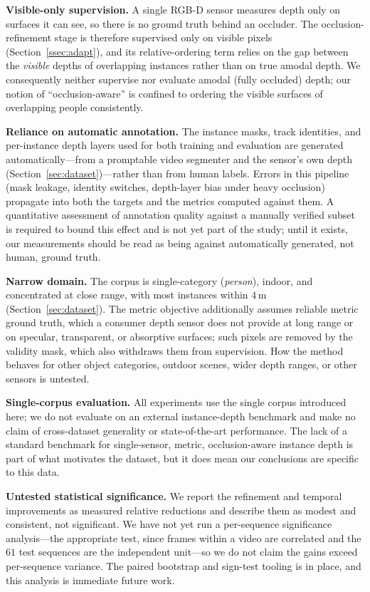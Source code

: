 \documentclass[sigconf, review=true]{acmart}
\begin{document}
\smallskip\noindent\textbf{Visible-only supervision.}
A single RGB-D sensor measures depth only on surfaces it can see, so there is no
ground truth behind an occluder. The occlusion-refinement stage is therefore
supervised only on visible pixels (Section~\ref{ssec:adapt}), and its
relative-ordering term relies on the gap between the \emph{visible} depths of
overlapping instances rather than on true amodal depth. We consequently neither
supervise nor evaluate amodal (fully occluded) depth; our notion of
``occlusion-aware'' is confined to ordering the visible surfaces of overlapping
people consistently.

\smallskip\noindent\textbf{Reliance on automatic annotation.}
The instance masks, track identities, and per-instance depth layers used for
both training and evaluation are generated automatically---from a promptable
video segmenter and the sensor's own depth (Section~\ref{sec:dataset})---rather
than from human labels. Errors in this pipeline (mask leakage, identity
switches, depth-layer bias under heavy occlusion) propagate into both the
targets and the metrics computed against them. A quantitative assessment of
annotation quality against a manually verified subset is required to bound this
effect and is not yet part of the study; until it exists, our measurements
should be read as being against automatically generated, not human, ground
truth.

\smallskip\noindent\textbf{Narrow domain.}
The corpus is single-category (\emph{person}), indoor, and concentrated at close
range, with most instances within $4\,$m (Section~\ref{sec:dataset}). The metric
objective additionally assumes reliable metric ground truth, which a consumer
depth sensor does not provide at long range or on specular, transparent, or
absorptive surfaces; such pixels are removed by the validity mask, which also
withdraws them from supervision. How the method behaves for other object
categories, outdoor scenes, wider depth ranges, or other sensors is untested.

\smallskip\noindent\textbf{Single-corpus evaluation.}
All experiments use the single corpus introduced here; we do not evaluate on an
external instance-depth benchmark and make no claim of cross-dataset generality
or state-of-the-art performance. The lack of a standard benchmark for
single-sensor, metric, occlusion-aware instance depth is part of what motivates
the dataset, but it does mean our conclusions are specific to this data.

\smallskip\noindent\textbf{Untested statistical significance.}
We report the refinement and temporal improvements as measured relative
reductions and describe them as modest and consistent, not significant. We have
not yet run a per-sequence significance analysis---the appropriate test, since
frames within a video are correlated and the $61$ test sequences are the
independent unit---so we do not claim the gains exceed per-sequence variance.
The paired bootstrap and sign-test tooling is in place, and this analysis is
immediate future work.
\end{document}
